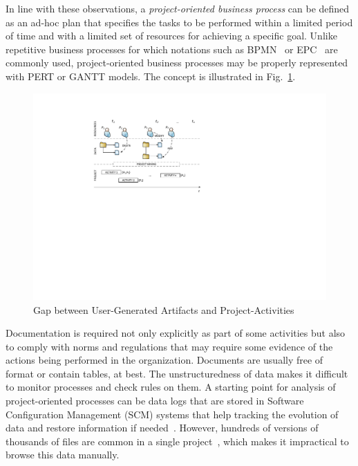 
In line with these observations, a \textit{project-oriented business process} can be defined as an ad-hoc plan that specifies the tasks to be performed within a limited period of time and with a limited set of resources for achieving a specific goal. Unlike repetitive business processes for which notations such as BPMN~\citep{bpmn2_stable} or EPC~\citep{vanderaalst_formalization_1999} are commonly used, project-oriented business processes may be properly represented with PERT or GANTT models. The concept is illustrated in Fig.~\ref{fig:bpm2015problem}.


\begin{figure}[tb]
\centering
\includegraphics[width=.8\textwidth]{bpm2015/imgs/ProjectMining.pdf}
\caption{Gap between User-Generated Artifacts and Project-Activities}
\label{fig:bpm2015problem}
\end{figure}

Documentation is required not only explicitly as part of some activities but also to comply with norms and regulations that may require some evidence of the actions being performed in the organization. Documents are usually free of format or contain tables, at best. The unstructuredness of data makes it difficult to monitor processes and check rules on them. A starting point for analysis of project-oriented processes can be data logs %
that are stored in Software Configuration Management (SCM) systems that help tracking the evolution of data and restore information if needed~\citep{voinea_open_2006}.
However, hundreds of versions of thousands of files are common in a single project~\citep{voinea_multiscale_2006}, which makes it impractical to browse this data manually.


